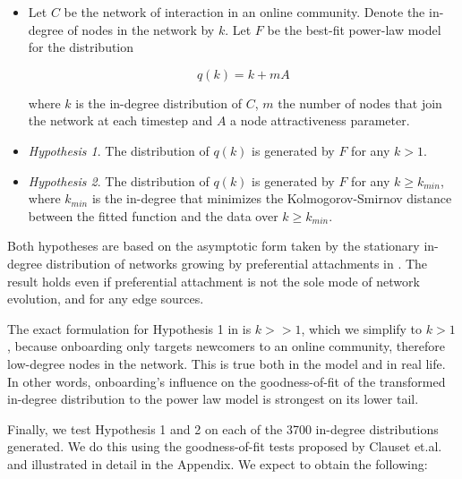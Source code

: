 \documentclass{bmcart}
\begin{document}
\begin{itemize}
\item Let $C$ be the network of interaction in an online community. Denote the in-degree of nodes in the network by $k$. Let $F$ be the best-fit power-law model for the distribution 

\begin{equation}
\label{eq:tIDD}
 q(k) = k + mA
\end{equation}
 
 where $k$ is the in-degree distribution of $C$, $m$ the number of nodes that join the network at each timestep and $A$ a node attractiveness parameter.
\item \emph{Hypothesis 1}. The distribution of $q(k)$ is generated by $F$ for any $k > 1$. %
\item \emph{Hypothesis 2}. The distribution of $q(k)$ is generated by $F$ for any $k \geq k_{min}$, where $k_{min}$ is the in-degree that minimizes the Kolmogorov-Smirnov distance between the fitted function and the data over $k \geq k_{min}$.
\end{itemize}

Both hypotheses are based on the asymptotic form taken by the stationary in-degree distribution of networks growing by preferential attachments in \cite{dorogovtsev2002evolution}. The result holds even if preferential attachment is not the sole mode of network evolution, and for any edge sources.

The exact formulation for Hypothesis 1 in \cite{dorogovtsev2002evolution} is $k > > 1$, which we simplify to $k > 1$, because onboarding only targets newcomers to an online community, therefore low-degree nodes in the network. This is true both in the model and in real life. In other words, onboarding's influence on the goodness-of-fit of the  transformed in-degree distribution to the power law model is strongest on its lower tail. 

Finally, we test Hypothesis 1 and 2 on each of the 3700 in-degree distributions generated. We do this using the goodness-of-fit tests proposed by Clauset et.al. \cite{clauset2009power} and illustrated in detail in the Appendix. We expect to obtain the following:
\end{document}

